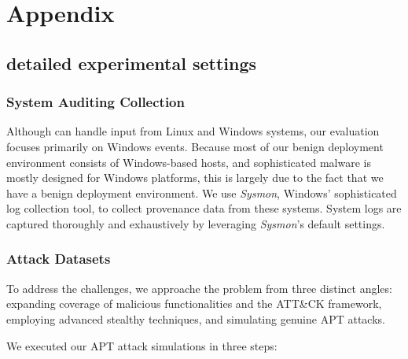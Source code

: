 \section{Appendix}



\subsection{detailed experimental settings}

\subsubsection{System Auditing Collection}
Although \tool can handle input from Linux and Windows systems, our evaluation focuses primarily on Windows events. Because most of our benign deployment environment consists of Windows-based hosts, and sophisticated malware is mostly designed for Windows platforms, this is largely due to the fact that we have a benign deployment environment. We use \textit{Sysmon}, Windows' sophisticated log collection tool, to collect provenance data from these systems. System logs are captured thoroughly and exhaustively by leveraging \textit{Sysmon}'s default settings.

\subsubsection{Attack Datasets}

To address the challenges, we approache the problem from three distinct angles: expanding coverage of malicious functionalities and the ATT\&CK framework, employing advanced stealthy techniques, and simulating genuine APT attacks.

We executed our APT attack simulations in three steps:

